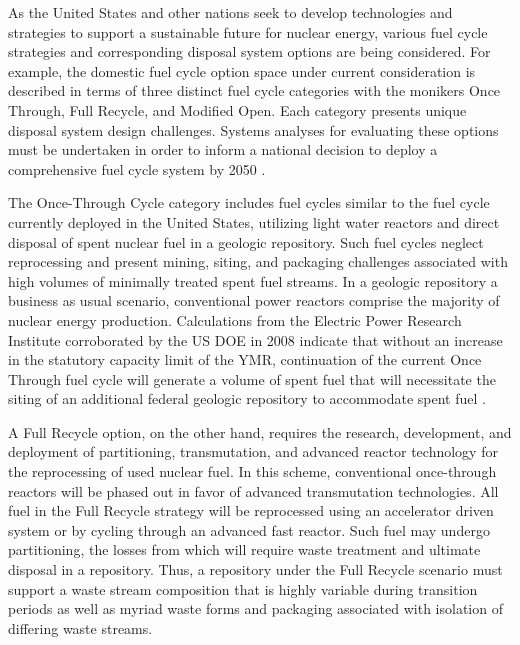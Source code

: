 

As the United States and other nations seek to develop technologies and 
strategies to support a sustainable future for nuclear energy, various fuel 
cycle strategies and corresponding disposal system options are being considered. 
For example, the domestic fuel cycle option space under current consideration is 
described in terms of three distinct fuel cycle categories with the monikers 
Once Through, Full Recycle, and Modified Open. Each category presents unique 
disposal system design challenges. Systems analyses for evaluating these options 
must be undertaken in order to inform a national decision to deploy a 
comprehensive fuel cycle system by 2050 \cite{doe_nuclear_2010}. 


The Once-Through Cycle category includes fuel cycles similar to the fuel cycle 
currently deployed in the United States, utilizing light water reactors and 
direct disposal of spent nuclear fuel in a geologic repository.  Such fuel 
cycles neglect reprocessing and present mining, siting, and packaging challenges 
associated with high volumes of minimally treated spent fuel streams.  In a 
geologic repository a business as usual scenario, conventional power reactors 
comprise the majority of nuclear energy production.  Calculations from the 
Electric Power Research Institute corroborated by the \gls{US} \gls{DOE} in 2008 
indicate that without an increase in the statutory capacity limit of the 
\gls{YMR}, continuation of the current Once Through fuel cycle will generate a 
volume of spent fuel that will necessitate the siting of an additional federal 
geologic repository to accommodate spent fuel \cite{kessler_room_2006, 
doe_report_2008}. 


A Full Recycle option, on the other hand, requires the research, development, 
and deployment of partitioning, transmutation, and advanced reactor technology 
for the reprocessing of used nuclear fuel.  In this scheme, conventional 
once-through reactors will be phased out in favor of advanced transmutation 
technologies. All fuel in the Full Recycle strategy will be 
reprocessed using an accelerator driven system or by 
cycling through an advanced fast reactor. Such fuel may undergo partitioning, 
the losses from which will require waste treatment and ultimate disposal in a 
repository. Thus, a repository under the Full Recycle scenario must support
a waste stream composition that is highly variable during transition periods as 
well as myriad waste forms and packaging associated with isolation of differing 
waste streams.

